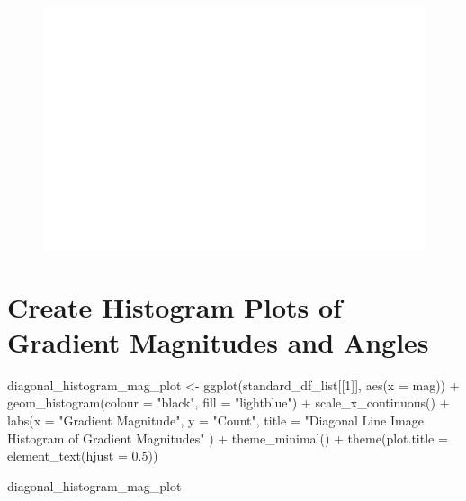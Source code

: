 \documentclass[
  letterpaper,
  DIV=11,
  numbers=noendperiod]{scrreprt}
\newenvironment{Shaded}{\begin{snugshade}}{\end{snugshade}}
\newcommand{\AttributeTok}[1]{\textcolor[rgb]{0.40,0.45,0.13}{#1}}
\newcommand{\DecValTok}[1]{\textcolor[rgb]{0.68,0.00,0.00}{#1}}
\newcommand{\FloatTok}[1]{\textcolor[rgb]{0.68,0.00,0.00}{#1}}
\newcommand{\FunctionTok}[1]{\textcolor[rgb]{0.28,0.35,0.67}{#1}}
\newcommand{\NormalTok}[1]{\textcolor[rgb]{0.00,0.23,0.31}{#1}}
\newcommand{\OtherTok}[1]{\textcolor[rgb]{0.00,0.23,0.31}{#1}}
\newcommand{\SpecialCharTok}[1]{\textcolor[rgb]{0.37,0.37,0.37}{#1}}
\newcommand{\StringTok}[1]{\textcolor[rgb]{0.13,0.47,0.30}{#1}}
\begin{document}
\begin{figure}[H]

{\centering \includegraphics{results_files/figure-pdf/unnamed-chunk-8-2.pdf}

}

\end{figure}

\hypertarget{create-histogram-plots-of-gradient-magnitudes-and-angles}{%
\section{Create Histogram Plots of Gradient Magnitudes and
Angles}\label{create-histogram-plots-of-gradient-magnitudes-and-angles}}

\begin{Shaded}
\begin{Highlighting}[]
\NormalTok{diagonal\_histogram\_mag\_plot }\OtherTok{\textless{}{-}}
  \FunctionTok{ggplot}\NormalTok{(standard\_df\_list[[}\DecValTok{1}\NormalTok{]], }\FunctionTok{aes}\NormalTok{(}\AttributeTok{x =}\NormalTok{ mag)) }\SpecialCharTok{+}
  \FunctionTok{geom\_histogram}\NormalTok{(}\AttributeTok{colour =} \StringTok{"black"}\NormalTok{, }\AttributeTok{fill =} \StringTok{"lightblue"}\NormalTok{) }\SpecialCharTok{+}
  \FunctionTok{scale\_x\_continuous}\NormalTok{() }\SpecialCharTok{+} 
  \FunctionTok{labs}\NormalTok{(}\AttributeTok{x =} \StringTok{"Gradient Magnitude"}\NormalTok{, }
       \AttributeTok{y =} \StringTok{"Count"}\NormalTok{, }
       \AttributeTok{title =} \StringTok{"Diagonal Line Image Histogram of Gradient Magnitudes"}
\NormalTok{       ) }\SpecialCharTok{+}
  \FunctionTok{theme\_minimal}\NormalTok{() }\SpecialCharTok{+}
  \FunctionTok{theme}\NormalTok{(}\AttributeTok{plot.title =} \FunctionTok{element\_text}\NormalTok{(}\AttributeTok{hjust =} \FloatTok{0.5}\NormalTok{))}

\NormalTok{diagonal\_histogram\_mag\_plot}
\end{Highlighting}
\end{Shaded}
\end{document}

